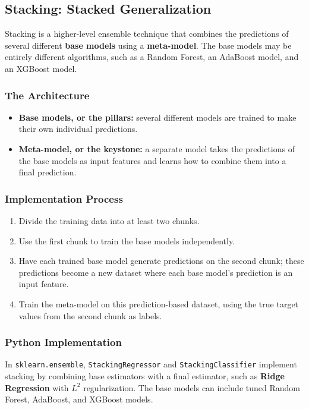 \documentclass[12pt,openany]{book}
\begin{document}
\subsection{Stacking: Stacked Generalization}

Stacking is a higher-level ensemble technique that combines the predictions of several different \textbf{base models} using a \textbf{meta-model}. The base models may be entirely different algorithms, such as a Random Forest, an AdaBoost model, and an XGBoost model.

\subsubsection{The Architecture}

\begin{itemize}[leftmargin=*]
    \item \textbf{Base models, or the pillars:} several different models are trained to make their own individual predictions.
    \item \textbf{Meta-model, or the keystone:} a separate model takes the predictions of the base models as input features and learns how to combine them into a final prediction.
\end{itemize}

\subsubsection{Implementation Process}

\begin{enumerate}[leftmargin=*]
    \item Divide the training data into at least two chunks.
    \item Use the first chunk to train the base models independently.
    \item Have each trained base model generate predictions on the second chunk; these predictions become a new dataset where each base model's prediction is an input feature.
    \item Train the meta-model on this prediction-based dataset, using the true target values from the second chunk as labels.
\end{enumerate}

\subsubsection{Python Implementation}

In \texttt{sklearn.ensemble}, \texttt{StackingRegressor} and \texttt{StackingClassifier} implement stacking by combining base estimators with a final estimator, such as \textbf{Ridge Regression} with \(L^2\) regularization. The base models can include tuned Random Forest, AdaBoost, and XGBoost models.
\end{document}
